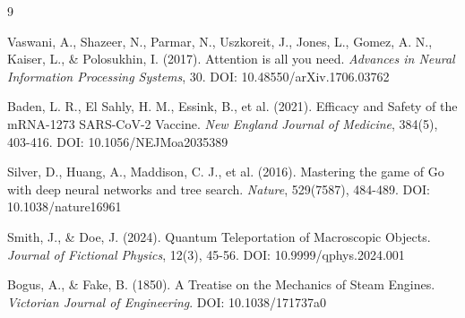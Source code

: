 \documentclass{article}
\begin{document}
\begin{thebibliography}{9}

Vaswani, A., Shazeer, N., Parmar, N., Uszkoreit, J., Jones, L., Gomez, A. N., Kaiser, L., \& Polosukhin, I. (2017). Attention is all you need. \emph{Advances in Neural Information Processing Systems}, 30. DOI: 10.48550/arXiv.1706.03762

Baden, L. R., El Sahly, H. M., Essink, B., et al. (2021). Efficacy and Safety of the mRNA-1273 SARS-CoV-2 Vaccine. \emph{New England Journal of Medicine}, 384(5), 403-416. DOI: 10.1056/NEJMoa2035389

Silver, D., Huang, A., Maddison, C. J., et al. (2016). Mastering the game of Go with deep neural networks and tree search. \emph{Nature}, 529(7587), 484-489. DOI: 10.1038/nature16961

Smith, J., \& Doe, J. (2024). Quantum Teleportation of Macroscopic Objects. \emph{Journal of Fictional Physics}, 12(3), 45-56. DOI: 10.9999/qphys.2024.001

Bogus, A., \& Fake, B. (1850). A Treatise on the Mechanics of Steam Engines. \emph{Victorian Journal of Engineering}. DOI: 10.1038/171737a0

\end{thebibliography}
\end{document}
